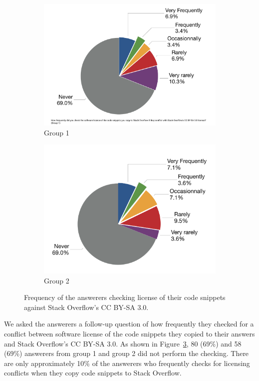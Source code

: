 \documentclass{svjour3}                     %
\begin{document}
\begin{figure}
	\begin{subfigure}{.5\textwidth}
		\centering
		\includegraphics[width=.75\linewidth]{survey_license_check_1}
		\caption{Group 1}
		\label{fig:survey_license_check_1}
	\end{subfigure}%
	\begin{subfigure}{.5\textwidth}
		\centering
		\includegraphics[width=.75\linewidth]{survey_license_check_2}
		\caption{Group 2}
		\label{fig:survey_license_check_2}
	\end{subfigure}
	\caption{Frequency of the answerers checking license of their code snippets against Stack Overflow's CC BY-SA 3.0.}
	\label{fig:survey_license_check}
\end{figure}

We asked the answerers a follow-up question of how frequently they checked for a
conflict between software license of the code snippets they copied to their
answers and Stack Overflow's CC BY-SA 3.0. As shown in
Figure~\ref{fig:survey_license_check}, 80 (69\%) and 58 (69\%) answerers from
group 1 and group 2 did not perform the checking. There are only approximately
10\% of the answerers who frequently checks for licensing conflicts when they
copy code snippets to Stack Overflow.
\end{document}
